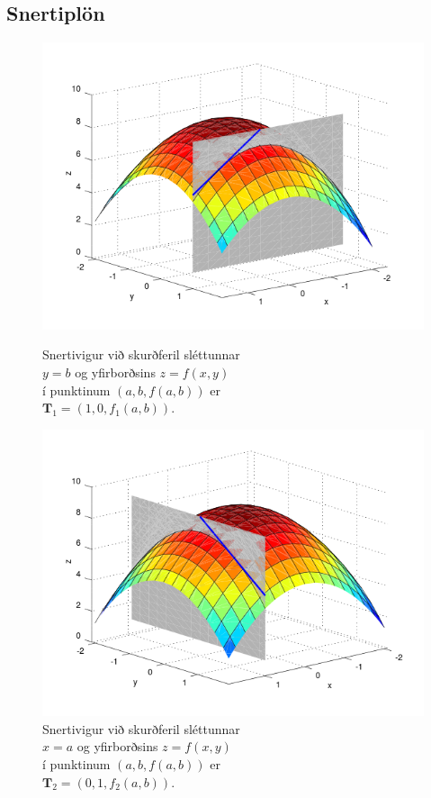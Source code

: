 \subsection{Snertiplön}
 \begin{figure}[!h]
        \centering
        \begin{minipage}{.5\textwidth}
            \centering
            \includegraphics[width=1\linewidth]{xpart.png}
            \caption*{Snertivigur við skurðferil sléttunnar \\ $y=b$ og yfirborðsins $z = f(x,y)$ \\ í punktinum $(a,b,f(a,b))$ er \\ $\mathbf{T}_1 = (1,0,f_1(a,b))$.}
        \end{minipage}%
        \begin{minipage}{.5\textwidth}
            \centering
            \includegraphics[width=1\linewidth]{ypart.png}
            \caption*{Snertivigur við skurðferil sléttunnar \\ $x=a$ og yfirborðsins $z = f(x,y)$ \\ í punktinum $(a,b,f(a,b))$ er \\ $\mathbf{T}_2 = (0,1,f_2(a,b))$.}
        \end{minipage}
    \end{figure}
 



